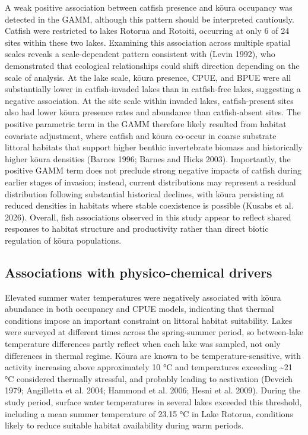 \documentclass[
  12pt,
  a4paper,
  oneside]{scrbook}
\begin{document}
A weak positive association between catfish presence and kōura occupancy
was detected in the GAMM, although this pattern should be interpreted
cautiously. Catfish were restricted to lakes Rotorua and Rotoiti,
occurring at only 6 of 24 sites within these two lakes. Examining this
association across multiple spatial scales reveals a scale-dependent
pattern consistent with (Levin 1992), who demonstrated that ecological
relationships could shift direction depending on the scale of analysis.
At the lake scale, kōura presence, CPUE, and BPUE were all substantially
lower in catfish-invaded lakes than in catfish-free lakes, suggesting a
negative association. At the site scale within invaded lakes,
catfish-present sites also had lower kōura presence rates and abundance
than catfish-absent sites. The positive parametric term in the GAMM
therefore likely resulted from habitat covariate adjustment, where
catfish and kōura co-occur in coarse substrate littoral habitats that
support higher benthic invertebrate biomass and historically higher
kōura densities (Barnes 1996; Barnes and Hicks 2003). Importantly, the
positive GAMM term does not preclude strong negative impacts of catfish
during earlier stages of invasion; instead, current distributions may
represent a residual distribution following substantial historical
declines, with kōura persisting at reduced densities in habitats where
stable coexistence is possible (Kusabs et al. 2026). Overall, fish
associations observed in this study appear to reflect shared responses
to habitat structure and productivity rather than direct biotic
regulation of kōura populations.

\subsection{Associations with physico-chemical
drivers}\label{associations-with-physico-chemical-drivers}

Elevated summer water temperatures were negatively associated with kōura
abundance in both occupancy and CPUE models, indicating that thermal
conditions impose an important constraint on littoral habitat
suitability. Lakes were surveyed at different times across the
spring-summer period, so between-lake temperature differences partly
reflect when each lake was sampled, not only differences in thermal
regime. Kōura are known to be temperature-sensitive, with activity
increasing above approximately 10 °C and temperatures exceeding
\textasciitilde21 °C considered thermally stressful, and probably
leading to aestivation (Devcich 1979; Angilletta et al. 2004; Hammond et
al. 2006; Hesni et al. 2009). During the study period, surface water
temperatures in several lakes exceeded this threshold, including a mean
summer temperature of 23.15 °C in Lake Rotorua, conditions likely to
reduce suitable habitat availability during warm periods.
\end{document}
